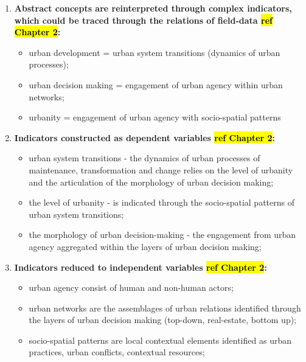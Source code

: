 \documentclass[11pt]{report}
\begin{document}
\begin{enumerate}
\item \textbf{Abstract concepts are reinterpreted through complex indicators, which could be traced through the relations of field-data \hl{ref Chapter 2}:}

\begin{itemize}
\item urban development = urban system transitions (dynamics of urban processes);
\item urban decision making = engagement of urban agency within urban networks;
\item urbanity = engagement of urban agency with socio-spatial patterns
\end{itemize}

\item \textbf{Indicators constructed as dependent variables \hl{ref Chapter 2}:}
\begin{itemize}
\item urban system transitions - the dynamics of urban processes of maintenance, transformation and change relies on the level of urbanity and the articulation of the morphology of urban decision making;
\item the level of urbanity - is indicated through the socio-spatial patterns of urban system transitions;
\item the morphology of urban decision-making - the engagement from urban agency aggregated within the layers of urban decision making;
\end{itemize}

\item \textbf{Indicators reduced to independent variables \hl{ref Chapter 2}:}
\begin{itemize}
\item urban agency consist of human and non-human actors;
\item urban networks are the assemblages of urban relations identified through the layers of urban decision making (top-down, real-estate, bottom up);
\item socio-spatial patterns are local contextual elements identified as urban practices, urban conflicts, contextual resources;
\end{itemize}
\end{enumerate}
\end{document}
